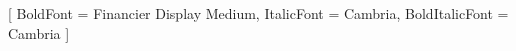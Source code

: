 \usepackage[T1]{fontenc}
\usepackage{fontspec}
\setmainfont{Financier Text}[
    BoldFont = Financier Display Medium,
    ItalicFont = Cambria,
    BoldItalicFont = Cambria
]
\setmonofont{JetBrains Mono}
\usepackage{unicode-math}
